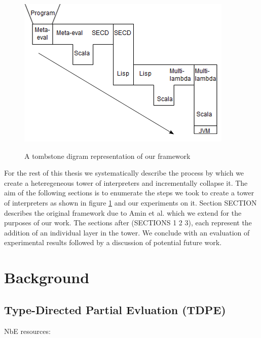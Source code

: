\documentclass{article}
\theoremstyle{definition}
\begin{document}
\begin{figure}[t]
	\centering
	\includegraphics[scale=2]{tombstone_tower.png}
	\label{fig:tombstone}
	\caption{A tombstone digram representation of our framework}
\end{figure}

For the rest of this thesis we systematically describe the process by which we create a heteregeneous tower of interpreters and incrementally collapse it. The aim of the following sections is to enumerate the steps we took to create a tower of interpreters as shown in figure \ref{fig:tombstone} and our experiments on it. Section SECTION describes the original framework due to Amin et al. \cite{amin2017collapsing} which we extend for the purposes of our work. The sections after (SECTIONS 1 2 3), each represent the addition of an individual layer in the tower. We conclude with an evaluation of experimental results followed by a discussion of potential future work.

\section{Background}
\subsection{Type-Directed Partial Evluation (TDPE)}
NbE resources:
\end{document}
